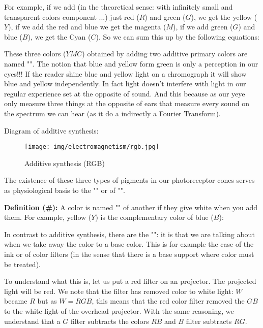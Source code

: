 	For example, if we add (in the theoretical sense: with infinitely small and transparent colors component ...) just red ($R$) and green ($G$), we get the yellow ($Y$), if we add the red and blue we get the magenta ($M$), if we add green ($G$) and blue ($B$), we get the Cyan ($C$). So we can sum this up by the following equations:
	
	These three colors ($YMC$) obtained by adding two additive primary colors are named "". The notion that blue and yellow form green is only a perception in our eyes!!! If the reader shine blue and yellow light on a chromograph it will show blue and yellow independently. In fact light doesn't interfere with light in our regular experience set at the opposite of sound. And this because as our yeye only measure three things at the opposite of ears that measure every sound on the spectrum we can hear (as it do a indirectly a Fourier Transform).
	
	Diagram of additive synthesis:
	\begin{figure}[H]
		\centering
		\texttt{[image: img/electromagnetism/rgb.jpg]}
		\caption{Additive synthesis (RGB)}
	\end{figure}
	The existence of these three types of pigments in our photoreceptor cones serves as physiological basis to the "" or of "".
	
	\textbf{Definition (\#\mydef):} A color is named "" of another if they give white when you add them. For example, yellow ($Y$) is the complementary color of blue ($B$):
	
	In contrast to additive synthesis, there are the "": it is that we are talking about when we take away the color to a base color. This is for example the case of the ink or of color filters (in the sense that there is a base support where color must be treated).
	
	To understand what this is, let us put a red filter on an projector. The projected light will be red. We note that the filter has removed color to white light: $W$ became $R$ but as $W = RGB$, this means that the red color filter removed the $GB$ to the white light of the overhead projector. With the same reasoning, we understand that a $G$ filter subtracts the colors $RB$ and $B$ filter subtracts $RG$.
	
